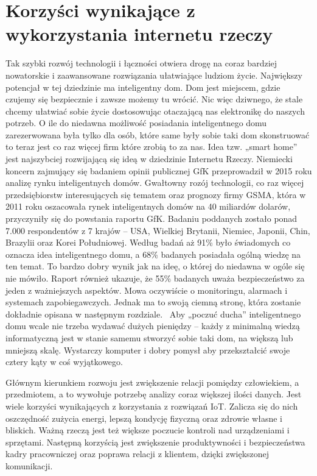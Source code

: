 \documentclass[brudnopis]{xmgr}
\begin{document}
\section{Korzyści wynikające z wykorzystania internetu rzeczy}
Tak szybki rozwój technologii i łączności otwiera drogę na coraz bardziej nowatorskie i zaawansowane rozwiązania ułatwiające ludziom życie. Największy potencjał w tej dziedzinie ma inteligentny dom. Dom jest miejscem, gdzie czujemy się bezpiecznie i zawsze możemy tu wrócić. Nic więc dziwnego, że stale chcemy ułatwiać sobie życie dostosowując otaczającą nas elektronikę do naszych potrzeb.
O ile do niedawna możliwość posiadania inteligentnego domu zarezerwowana była tylko dla osób, które same były sobie taki dom skonstruować to teraz jest co raz więcej firm które zrobią to za nas. Idea tzw. „smart home” jest najszybciej rozwijającą się ideą w dziedzinie Internetu Rzeczy. Niemiecki koncern zajmujący się badaniem opinii publicznej GfK przeprowadził w 2015 roku analizę rynku inteligentnych domów. Gwałtowny rozój technologii, co raz więcej przedsiębiorstw interesujących się tematem oraz prognozy firmy GSMA, która w 2011 roku oszacowała rynek inteligentnych domów na 40 miliardów dolarów, przyczyniły się do powstania raportu GfK. Badaniu poddanych zostało ponad 7.000 respondentów z 7 krajów – USA, Wielkiej Brytanii, Niemiec, Japonii, Chin, Brazylii oraz Korei Południowej. Według badań aż 91\% było świadomych co oznacza idea inteligentnego domu, a 68\% badanych posiadała ogólną wiedzę na ten temat. To bardzo dobry wynik jak na ideę, o której do niedawna w ogóle się nie mówiło.
Raport również ukazuje, że 55\% badanych uważa bezpieczeństwo za jeden z ważniejszych aspektów. Mowa oczywiście o monitoringu, alarmach i systemach zapobiegawczych. Jednak ma to swoją ciemną stronę, która zostanie dokładnie opisana w następnym rozdziale.~\cite{Gfk:2015:CMC}
Aby „poczuć ducha” inteligentnego domu wcale nie trzeba wydawać dużych pieniędzy – każdy z minimalną wiedzą informatyczną jest w stanie samemu stworzyć sobie taki dom, na większą lub mniejszą skalę. Wystarczy komputer i dobry pomysł aby przekształcić swoje cztery kąty w coś wyjątkowego.

Głównym kierunkiem rozwoju jest zwiększenie relacji pomiędzy człowiekiem, a przedmiotem, a to wywołuje potrzebę analizy coraz większej ilości danych. 
Jest wiele korzyści wynikających z korzystania z rozwiązań IoT. Zalicza się do nich oszczędność zużycia energi, lepszą kondycję fizyczną oraz zdrowie własne i bliskich. Ważną rzeczą jest też większe poczucie kontroli nad urządzeniami i sprzętami. Następną korzyścią jest zwiększenie produktywności i bezpieczeństwa kadry pracowniczej oraz poprawa relacji z klientem, dzięki zwiększonej komunikacji.
\end{document}
